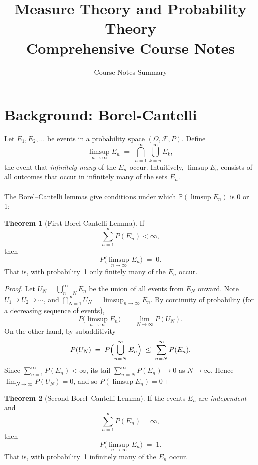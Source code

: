 \documentclass[11pt,a4paper]{article}
\title{\textbf{Measure Theory and Probability Theory} \\ \large Comprehensive Course Notes}
\author{Course Notes Summary}
\date{}
\theoremstyle{definition}
\newtheorem{theorem}{Theorem}[section]
\begin{document}
\maketitle
\tableofcontents
\newpage

\section{Background: Borel-Cantelli}

Let $E_1,E_2,\dots$ be events in a probability space $(\Omega,\mathcal{F},P)$.  Define 
\[
\limsup_{n\to\infty} E_n \;=\; \bigcap_{n=1}^{\infty} \bigcup_{k=n}^{\infty} E_k,
\]
the event that \emph{infinitely many} of the $E_n$ occur. Intuitively, $\limsup E_n$ consists of all outcomes that occur in infinitely many of the sets $E_n$.
~\\~\\
The Borel--Cantelli lemmas give conditions under which $\mathbb{P}(\limsup E_n)$ is 0 or 1:

\begin{theorem}[First Borel-Cantelli Lemma]
If 
\[
\sum_{n=1}^{\infty} P(E_n) < \infty,
\]
then 
\[
P\bigl(\limsup_{n\to\infty} E_n\bigr) \;=\; 0.
\]
That is, with probability~1 only finitely many of the $E_n$ occur.
\end{theorem}

\begin{proof}
Let $U_N = \bigcup_{n=N}^{\infty} E_n$ be the union of all events from $E_N$ onward.  Note $U_1 \supseteq U_2 \supseteq \cdots$, and $\bigcap_{N=1}^\infty U_N = \limsup_{n\to\infty}E_n$.  By continuity of probability (for a decreasing sequence of events), 
\[
P\bigl(\limsup_{n\to\infty} E_n\bigr) \;=\; \lim_{N\to\infty} P(U_N). 
\] 
On the other hand, by subadditivity
\[
P(U_N) \;=\; P\Bigl(\bigcup_{n=N}^\infty E_n\Bigr) \;\le\; \sum_{n=N}^\infty P(E_n).
\] 
Since $\sum_{n=1}^\infty P(E_n)<\infty$, its tail $\sum_{n=N}^\infty P(E_n)\to0$ as $N\to\infty$.  Hence $\lim_{N\to\infty}P(U_N)=0$, and so $P(\limsup E_n)=0$
\end{proof}

\begin{theorem}[Second Borel--Cantelli Lemma]
If the events $E_n$ are \emph{independent} and 
\[
\sum_{n=1}^{\infty} P(E_n) = \infty,
\]
then 
\[
P\bigl(\limsup_{n\to\infty} E_n\bigr) \;=\; 1.
\]
That is, with probability~1 infinitely many of the $E_n$ occur.
\end{theorem}
\end{document}
